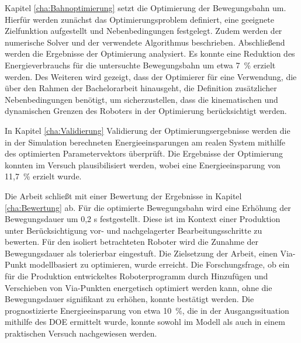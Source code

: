 Kapitel \ref{cha:Bahnoptimierung} setzt die Optimierung der Bewegungsbahn um. Hierfür werden zunächst das Optimierungsproblem definiert, eine geeignete Zielfunktion aufgestellt und Nebenbedingungen festgelegt. Zudem werden der numerische Solver und der verwendete Algorithmus beschrieben. Abschließend werden die Ergebnisse der Optimierung analysiert. Es konnte eine Reduktion des Energieverbrauchs für die untersuchte Bewegungsbahn um etwa 7~\% erzielt werden. Des Weiteren wird gezeigt, dass der Optimierer für eine Verwendung, die über den Rahmen der Bachelorarbeit hinausgeht, die Definition zusätzlicher Nebenbedingungen benötigt, um sicherzustellen, dass die kinematischen und dynamischen Grenzen des Roboters in der Optimierung berücksichtigt werden.

In Kapitel \ref{cha:Validierung} Validierung der Optimierungsergebnisse werden die in der Simulation berechneten Energieeinsparungen am realen System mithilfe des optimierten Parametervektors überprüft. Die Ergebnisse der Optimierung konnten im Versuch plausibilisiert werden, wobei eine Energieeinsparung von 11,7~\% erzielt wurde.

Die Arbeit schließt mit einer Bewertung der Ergebnisse in Kapitel \ref{cha:Bewertung} ab. Für die optimierte Bewegungsbahn wird eine Erhöhung der Bewegungsdauer um 0,2 s festgestellt. Diese ist im Kontext einer Produktion unter Berücksichtigung vor- und nachgelagerter Bearbeitungsschritte zu bewerten. Für den isoliert betrachteten Roboter wird die Zunahme der Bewegungsdauer als tolerierbar eingestuft. Die Zielsetzung der Arbeit, einen Via-Punkt modellbasiert zu optimieren, wurde erreicht. Die Forschungsfrage, ob ein für die Produktion entwickeltes Roboterprogramm durch Hinzufügen und Verschieben von Via-Punkten energetisch optimiert werden kann, ohne die Bewegungsdauer signifikant zu erhöhen, konnte bestätigt werden. Die prognostizierte Energieeinsparung von etwa 10~\%, die in der Ausgangssituation mithilfe des DOE ermittelt wurde, konnte sowohl im Modell als auch in einem praktischen Versuch nachgewiesen werden.

